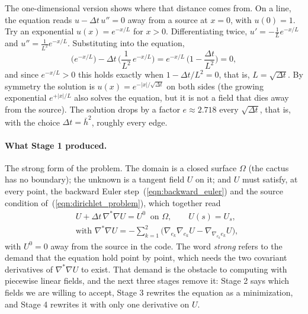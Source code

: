 The one-dimensional version shows where that distance comes from. On a line, the equation reads $u - \Delta t\, u'' = 0$ away from a source at $x = 0$, with $u(0) = 1$. Try an exponential $u(x) = e^{-x/L}$ for $x > 0$. Differentiating twice, $u' = -\frac1L e^{-x/L}$ and $u'' = \frac{1}{L^2} e^{-x/L}$. Substituting into the equation,
\begin{equation*}
\big(e^{-x/L}\big) - \Delta t\, \Big(\frac{1}{L^2}\, e^{-x/L}\Big) = e^{-x/L}\,\Big(1 - \frac{\Delta t}{L^2}\Big) = 0 ,
\end{equation*}
and since $e^{-x/L} > 0$ this holds exactly when $1 - \Delta t/L^2 = 0$, that is, $L = \sqrt{\Delta t}$. By symmetry the solution is $u(x) = e^{-|x|/\sqrt{\Delta t}}$ on both sides (the growing exponential $e^{+|x|/L}$ also solves the equation, but it is not a field that dies away from the source). The solution drops by a factor $e \approx 2.718$ every $\sqrt{\Delta t}$, that is, with the choice $\Delta t = \bar h^2$, roughly every edge.

\paragraph{What Stage 1 produced.} The strong form of the problem. The domain is a closed surface $\Omega$ (the cactus has no boundary); the unknown is a tangent field $U$ on it; and $U$ must satisfy, at every point, the backward Euler step~(\ref{eqn:backward_euler}) and the source condition of~(\ref{eqn:dirichlet_problem}), which together read
\begin{equation}
\label{eqn:r1_strong}
\boxed{\;\begin{aligned} & U + \Delta t\, \nabla^*\nabla U = U^0 \ \text{ on } \Omega, \qquad U(s) = U_s, \\ & \text{with } \nabla^*\nabla U = -\sum_{k=1}^2 \big( \nabla_{e_k} \nabla_{e_k} U - \nabla_{\nabla_{e_k} e_k} U \big), \end{aligned}\;}
\end{equation}
with $U^0 = 0$ away from the source in the code. The word \emph{strong} refers to the demand that the equation hold point by point, which needs the two covariant derivatives of $\nabla^*\nabla U$ to exist. That demand is the obstacle to computing with piecewise linear fields, and the next three stages remove it: Stage 2 says which fields we are willing to accept, Stage 3 rewrites the equation as a minimization, and Stage 4 rewrites it with only one derivative on $U$.

